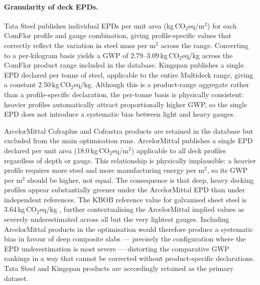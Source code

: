 \paragraph{Granularity of deck EPDs.}
Tata Steel publishes individual EPDs per unit area (kg\,CO$_2$eq/m$^2$) for each ComFlor profile and gauge combination, giving profile-specific values that correctly reflect the variation in steel mass per m$^2$ across the range. Converting to a per-kilogram basis yields a GWP of 2.79--3.09\,kg\,CO$_2$eq/kg across the ComFlor product range included in the database. Kingspan publishes a single EPD declared per tonne of steel, applicable to the entire Multideck range, giving a constant 2.50\,kg\,CO$_2$eq/kg. Although this is a product-range aggregate rather than a profile-specific declaration, the per-tonne basis is physically consistent: heavier profiles automatically attract proportionally higher GWP, so the single EPD does not introduce a systematic bias between light and heavy gauges.

ArcelorMittal Cofraplus and Cofrastra products are retained in the database but excluded from the main optimisation runs. ArcelorMittal publishes a single EPD declared per unit area (18.0\,kg\,CO$_2$eq/m$^2$) applicable to all deck profiles regardless of depth or gauge. This relationship is physically implausible: a heavier profile requires more steel and more manufacturing energy per m$^2$, so its GWP per m$^2$ should be higher, not equal. The consequence is that deep, heavy decking profiles appear substantially greener under the ArcelorMittal EPD than under independent references. The KBOB reference value for galvanised sheet steel is 3.64\,kg\,CO$_2$eq/kg \citep{RefWorks:kbob2022}, further contextualising the ArcelorMittal implied values as severely underestimated across all but the very lightest gauges. Including ArcelorMittal products in the optimisation would therefore produce a systematic bias in favour of deep composite slabs --- precisely the configuration where the EPD underestimation is most severe --- distorting the comparative GWP rankings in a way that cannot be corrected without product-specific declarations. Tata Steel and Kingspan products are accordingly retained as the primary dataset.
